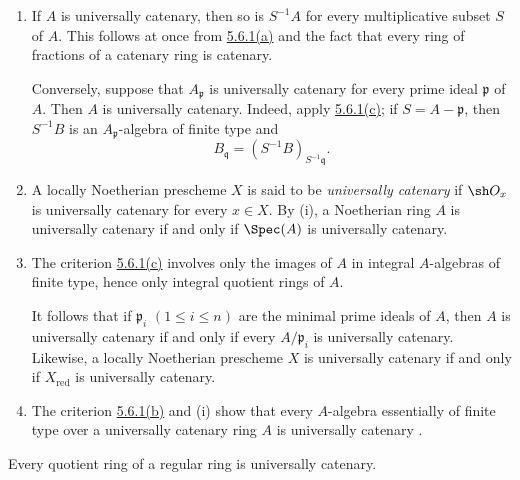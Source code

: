 \begin{remarks}[5.6.3]
\label{IV.5.6.3}
\begin{enumerate}[{\rm(i)}]
\item
{}
\label{IV.5.6.3.i}
If $A$ is universally catenary, then so is $S^{-1}A$ for every
multiplicative subset $S$ of $A$.  This follows at once from
\hyperref[IV.5.6.1.a]{5.6.1\textup{(a)}} and the fact that every ring
of fractions of a
catenary ring is catenary.

Conversely, suppose that $A_{\mathfrak p}$ is universally catenary
for every prime ideal $\mathfrak p$ of $A$.  Then $A$ is universally
catenary.  Indeed, apply
\hyperref[IV.5.6.1.c]{5.6.1\textup{(c)}}; if
$S=A-\mathfrak p$, then $S^{-1}B$ is an
$A_{\mathfrak p}$-algebra of finite type and
\[
B_{\mathfrak q}=(S^{-1}B)_{S^{-1}\mathfrak q}.
\]

\item
{}
\label{IV.5.6.3.ii}
A locally Noetherian prescheme $X$ is said to be
\emph{universally catenary} if $\sh O_x$ is universally catenary for
every $x\in X$.  By (i), a Noetherian ring $A$ is universally
catenary if and only if $\Spec(A)$ is universally catenary.

\item
{}
\label{IV.5.6.3.iii}
The criterion \hyperref[IV.5.6.1.c]{5.6.1\textup{(c)}} involves only
the images of $A$ in
integral $A$-algebras of finite type, hence only integral quotient
rings of $A$.


It follows that if
$\mathfrak p_i$ $(1\leq i\leq n)$ are the minimal prime ideals of
$A$, then $A$ is universally catenary if and only if every
$A/\mathfrak p_i$ is universally catenary.  Likewise, a locally
Noetherian prescheme $X$ is universally catenary if and only if
$X_{\mathrm{red}}$ is universally catenary.

\item
{}
\label{IV.5.6.3.iv}
The criterion \hyperref[IV.5.6.1.b]{5.6.1\textup{(b)}} and (i) show
that every $A$-algebra
essentially of finite type over a universally catenary ring $A$ is
universally catenary .
\end{enumerate}
\end{remarks}

\begin{proposition}[5.6.4]
\label{IV.5.6.4}
Every quotient ring of a regular ring is universally catenary.
\end{proposition}

